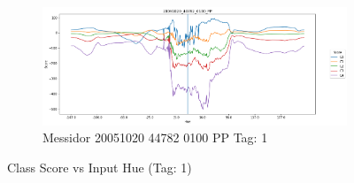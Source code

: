 \begin{figure}[ht!]
\begin{subfigure}[b]{ 0.85\textwidth}
		\centering
		\includegraphics[width=\textwidth]{Figures/chapter_stability/20051020_44782_0100_PP/h/scores.png}
		\caption{Messidor 20051020 44782 0100 PP Tag: 1}		
	\end{subfigure}
	\hfill 
	\caption[Score vs Hue (Tag: 1)]{Class Score vs Input Hue (Tag: 1)}  
	\label{sta:fig:hue1} 
\end{figure}

